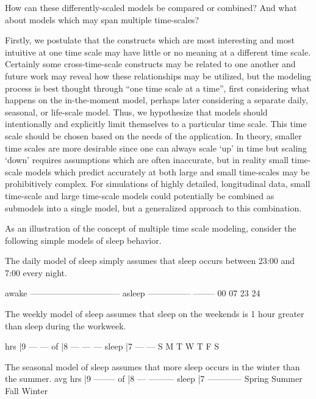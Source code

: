 \documentclass[runningheads,a4paper]{llncs}
\begin{document}
How can these differently-scaled models be compared or combined? And what about models which may span multiple time-scales?

Firstly, we postulate that the constructs which are most interesting and most intuitive at one time scale may have little or no meaning at a different time scale. Certainly some cross-time-scale constructs may be related to one another and future work may reveal how these relationships may be utilized, but the modeling process is best thought through “one time scale at a time”, first considering what happens on the in-the-moment model, perhaps later considering a separate daily, seasonal, or life-scale model. Thus, we hypothesize that models should intentionally and explicitly limit themselves to a particular time scale. This time scale should be chosen based on the needs of the application. In theory, smaller time scales are more desirable since one can always scale ‘up’ in time but scaling ‘down’ requires assumptions which are often inaccurate, but in reality small time-scale models which predict accurately at both large and small time-scales may be prohibitively complex.  For simulations of highly detailed, longitudinal data, small time-scale and large time-scale models could potentially be combined as submodels into a single model, but a generalized approach to this combination.

As an illustration of the concept of multiple time scale modeling, consider the following simple models of sleep behavior.

The daily model of sleep simply assumes that sleep occurs between 23:00 and 7:00 every night.

awake                 --------------------------------        
asleep ---------------                                --------
           00            07                               23     24

The weekly model of sleep assumes that sleep on the weekends is 1 hour greater than sleep during the workweek.

hrs   |9 ---                           ---
of    |8      ---       ---       ---     
sleep |7           ---       ---
         S    M    T    W    T    F    S    

The seasonal model of sleep assumes that more sleep occurs in the winter than the summer.
avg
hrs   |9                          --------
of    |8  ---            ---------          
sleep |7     ------------          
         Spring   Summer    Fall   Winter    
\end{document}
